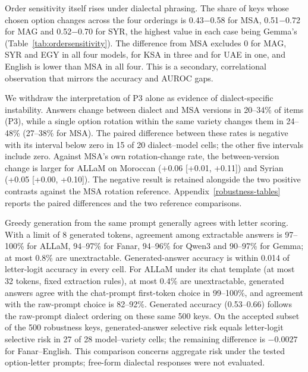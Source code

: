 \documentclass[applsci,article,submit,pdftex,oneauthor]{Definitions/mdpi}
\begin{document}
Order sensitivity itself rises under dialectal phrasing. The share of keys whose chosen option changes across the four orderings is 0.43$-$0.58 for MSA, 0.51$-$0.72 for MAG and 0.52$-$0.70 for SYR, the highest value in each case being Gemma's (Table~\ref{tab:ordersensitivity}). The difference from MSA excludes 0 for MAG, SYR and EGY in all four models, for KSA in three and for UAE in one, and English is lower than MSA in all four. This is a secondary, correlational observation that mirrors the accuracy and AUROC gaps.

We withdraw the interpretation of P3 alone as evidence of dialect-specific instability. Answers change between dialect and MSA versions in 20--34\% of items (P3), while a single option rotation within the same variety changes them in 24--48\% (27--38\% for MSA). The paired difference between these rates is negative with its interval below zero in 15 of 20 dialect--model cells; the other five intervals include zero. Against MSA's own rotation-change rate, the between-version change is larger for ALLaM on Moroccan (+0.06 [+0.01, +0.11]) and Syrian (+0.05 [+0.00, +0.10]). The negative result is retained alongside the two positive contrasts against the MSA rotation reference. Appendix~\ref{robustness-tables} reports the paired differences and the two reference comparisons.

Greedy generation from the same prompt generally agrees with letter scoring. With a limit of 8 generated tokens, agreement among extractable answers is 97--100\% for ALLaM, 94--97\% for Fanar, 94--96\% for Qwen3 and 90--97\% for Gemma; at most 0.8\% are unextractable. Generated-answer accuracy is within 0.014 of letter-logit accuracy in every cell. For ALLaM under its chat template (at most 32 tokens, fixed extraction rules), at most 0.4\% are unextractable, generated answers agree with the chat-prompt first-token choice in 99--100\%, and agreement with the raw-prompt choice is 82--92\%. Generated accuracy (0.53--0.66) follows the raw-prompt dialect ordering on these same 500 keys. On the accepted subset of the 500 robustness keys, generated-answer selective risk equals letter-logit selective risk in 27 of 28 model--variety cells; the remaining difference is $-0.0027$ for Fanar--English. This comparison concerns aggregate risk under the tested option-letter prompts; free-form dialectal responses were not evaluated.
\end{document}
